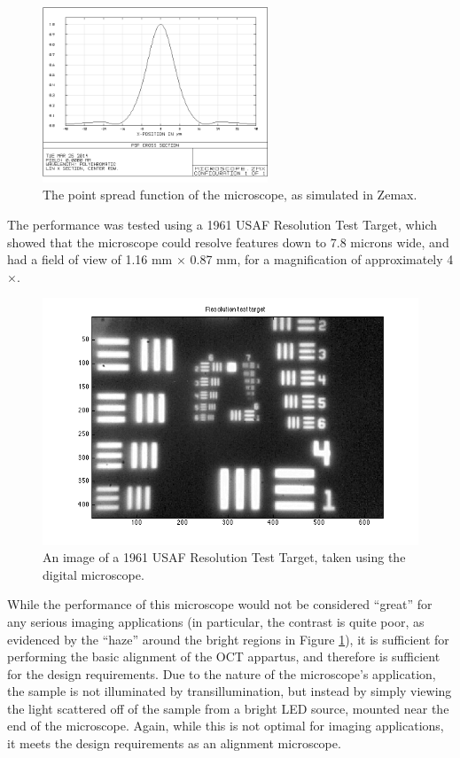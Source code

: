 \begin{figure}[h!]
\centering
\includegraphics[width=0.6\textwidth]{Images/Zemax/microscope_psf_2.png}
\caption[The point spread function of the microscope, as simulated in Zemax.]{The point spread function of the microscope, as simulated in Zemax.}
\end{figure}

The performance was tested using a 1961 USAF Resolution Test Target, which showed that the microscope could resolve features down to 7.8 microns wide, and had a field of view of 1.16 mm $\times$ 0.87 mm, for a magnification of approximately 4$\times$.

\begin{figure}[h!]

\centering
\includegraphics[width=1.0\textwidth]{Images/Microscope/target.png}
\caption{An image of a 1961 USAF Resolution Test Target, taken using the digital microscope. \label{fig:usaf}}
\end{figure}

While the performance of this microscope would not be considered ``great'' for any serious imaging applications (in particular, the contrast is quite poor, as evidenced by the ``haze'' around the bright regions in Figure \ref{fig:usaf}), it is sufficient for performing the basic alignment of the OCT appartus, and therefore is sufficient for the design requirements. Due to the nature of the microscope's application, the sample is not illuminated by transillumination, but instead by simply viewing the light scattered off of the sample from a bright LED source, mounted near the end of the microscope. Again, while this is not optimal for imaging applications, it meets the design requirements as an alignment microscope.

